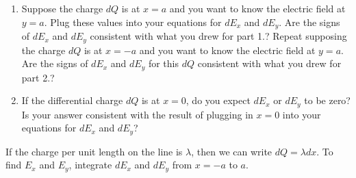 \documentclass{article}
\begin{document}
\begin{enumerate}
        \newpage
        \fi
        \ifsolutions\else
        \newpage
        \fi

  \item Suppose the charge $dQ$ is at $x=a$ and you want to know the electric field at $y=a$. Plug these values into your equations for $dE_x$ and $dE_y$. Are the signs of $dE_x$ and $dE_y$ consistent with what you drew for part 1.? Repeat supposing the charge $dQ$ is at $x=-a$ and you want to know the electric field at $y=a$. Are the signs of $dE_x$ and $dE_y$ for this $dQ$ consistent with what you drew for part 2.?

        \ifsolutions

        \else

        \vskip 36pt
        \fi
        \ifsolutions\else
        \vskip 36pt
        \fi

  \item If the differential charge $dQ$ is at $x=0$, do you expect $dE_x$ or $dE_y$ to be zero? Is your answer consistent with the result of plugging in $x=0$ into your equations for $dE_x$ and $dE_y$?

        \ifsolutions

        \else

        \vskip 36pt
        \fi
        \ifsolutions\else
        \vskip 36pt
        \fi

\end{enumerate}

If the charge per unit length on the line is $\lambda$, then we can write $dQ=\lambda dx$. To find $E_x$ and $E_y$, integrate $dE_x$ and $dE_y$ from $x=-a$ to $a$.
\end{document}
